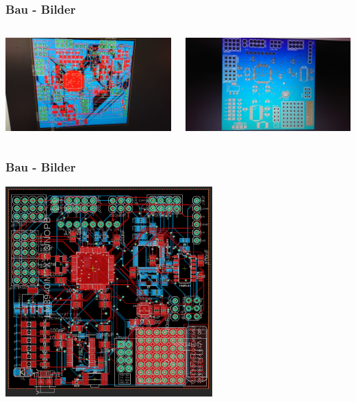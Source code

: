 \documentclass[12pt,a4paper, ngerman]{beamer}
\begin{document}
\begin{frame}
\frametitle{Bau - Bilder}
\begin{columns}
\begin{center}
\includegraphics[width=1\textwidth]{Board(1).jpg}
\end{center}
\begin{center}
\includegraphics[width=1\textwidth]{Board(2).jpg}
\end{center}
\end{columns}
\end{frame}


\begin{frame}
\frametitle{Bau - Bilder}
\begin{center}
\includegraphics[width=0.6\textwidth]{negativ.PNG}
\end{center}
\end{frame}
\end{document}
